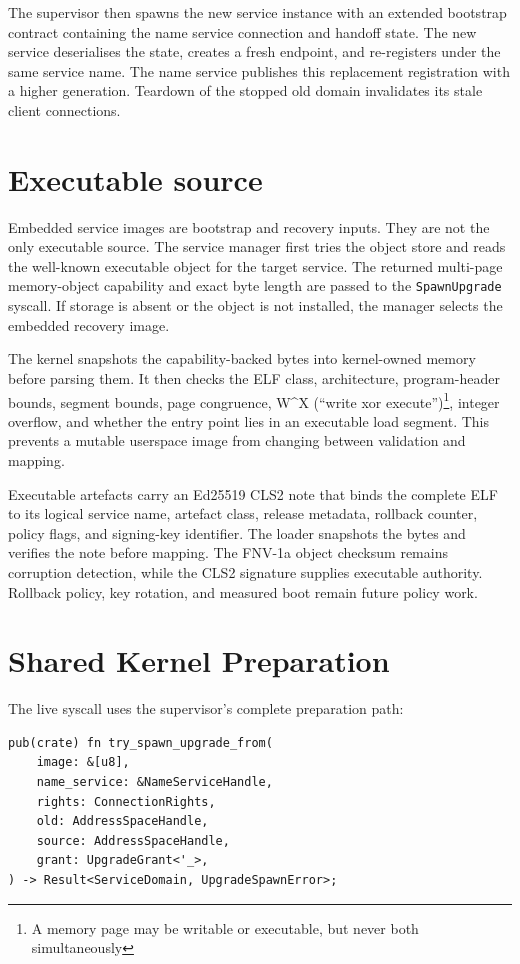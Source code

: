 The supervisor then spawns the new service instance with an extended bootstrap
contract containing the name service connection and handoff state. The new
service deserialises the state, creates a fresh endpoint, and re-registers under
the same service name. The name service publishes this replacement registration
with a higher generation. Teardown of the stopped old domain invalidates its
stale client connections.

\section{Executable source}

Embedded service images are bootstrap and recovery inputs. They are not the
only executable source. The service manager first tries the object store and
reads the well-known executable object for the target service. The returned
multi-page memory-object capability and exact byte length are passed to
the \texttt{SpawnUpgrade} syscall. If storage is absent or the object is not installed,
the manager selects the embedded recovery image.

The kernel snapshots the capability-backed bytes into kernel-owned memory before
parsing them. It then checks the ELF class, architecture, program-header bounds,
segment bounds, page congruence, W\^{}X (``write xor execute'')\footnote{A memory
page may be writable or executable, but never both simultaneously}, integer
overflow, and whether the entry point lies in an executable load segment.
This prevents a mutable userspace image from changing between validation and 
mapping.

Executable artefacts carry an Ed25519 CLS2 note that binds the complete ELF to
its logical service name, artefact class, release metadata, rollback counter,
policy flags, and signing-key identifier. The loader snapshots the bytes and
verifies the note before mapping. The FNV-1a object checksum remains corruption
detection, while the CLS2 signature supplies executable authority. Rollback policy,
key rotation, and measured boot remain future policy work.

\section{Shared Kernel Preparation}

The live syscall uses the supervisor's complete preparation path:

\begin{lstlisting}[style=rustCode]
pub(crate) fn try_spawn_upgrade_from(
    image: &[u8],
    name_service: &NameServiceHandle,
    rights: ConnectionRights,
    old: AddressSpaceHandle,
    source: AddressSpaceHandle,
    grant: UpgradeGrant<'_>,
) -> Result<ServiceDomain, UpgradeSpawnError>;
\end{lstlisting}

